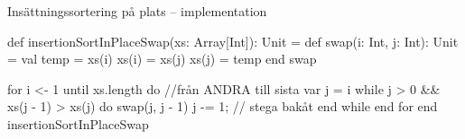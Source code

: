 \begin{Slide}{Insättningssortering på plats -- implementation} %
\begin{Code}
def insertionSortInPlaceSwap(xs: Array[Int]): Unit = 
  def swap(i: Int, j: Int): Unit = 
    val temp = xs(i)
    xs(i) = xs(j)
    xs(j) = temp
  end swap 

  for i <- 1 until xs.length do  //från ANDRA till sista
    var j = i
    while j > 0 && xs(j - 1) > xs(j) do
      swap(j, j - 1)
      j -= 1;  // stega bakåt
    end while
  end for
end insertionSortInPlaceSwap
\end{Code}
\end{Slide}

